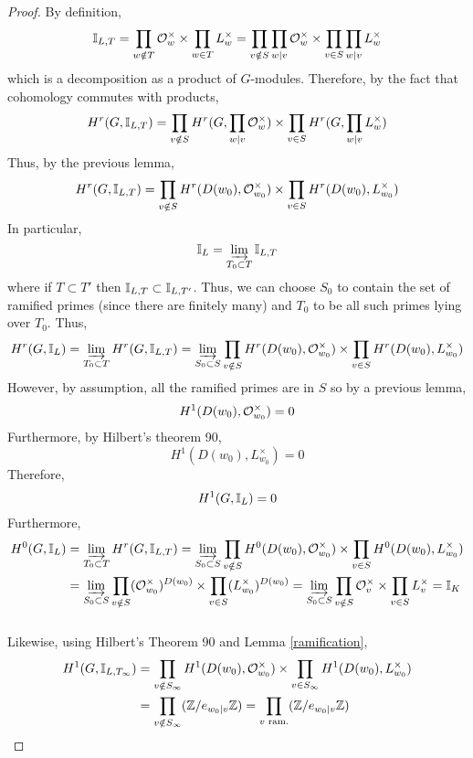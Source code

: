 \documentclass[12pt]{extarticle}
\begin{document}
\begin{proof}
By definition,
\[ \mathbb{I}_{L, T} = \prod_{w \notin T} \mathcal{O}_{w}^\times \times \prod_{w \in T} L_w^\times = \prod_{v \notin S} \prod_{w \mid v} \mathcal{O}_{w}^\times \times \prod_{v \in S} \prod_{w \mid v} L_w^\times \]
which is a decomposition as a product of $G$-modules. Therefore, by the fact that cohomology commutes with products,
\[ H^r(G, \mathbb{I}_{L, T}) = \prod_{v \notin S} H^r(G, \prod_{w \mid v} \mathcal{O}_{w}^\times) \times \prod_{v \in S} H^r(G, \prod_{w \mid v} L_w^\times) \]
Thus, by the previous lemma,
\[ H^r(G, \mathbb{I}_{L, T}) = \prod_{v \notin S} H^r(D(w_0), \mathcal{O}_{w_0}^\times) \times \prod_{v \in S} H^r(D(w_0), L_{w_0}^\times) \]
In particular, 
\[ \mathbb{I}_{L} = \varinjlim_{T_0 \subset T} \mathbb{I}_{L, T} \]
where if $T \subset T'$ then $\mathbb{I}_{L, T} \subset \mathbb{I}_{L, T'}$. Thus, we can choose $S_0$ to contain the set of ramified primes (since there are finitely many) and $T_0$ to be all such primes lying over $T_0$. Thus,
\[ H^r(G, \mathbb{I}_{L}) =  \varinjlim_{T_0 \subset T} H^r(G, \mathbb{I}_{L, T}) = \varinjlim_{S_0 \subset S} \prod_{v \notin S} H^r(D(w_0), \mathcal{O}_{w_0}^\times) \times \prod_{v \in S} H^r(D(w_0), L_{w_0}^\times) \]
However, by assumption, all the ramified primes are in $S$ so by a previous lemma,
\[ H^1(D(w_0), \mathcal{O}_{w_0}^\times) = 0 \]
Furthermore, by Hilbert's theorem 90,
\[ H^1(D(w_0), L_{w_0}^\times) = 0 \]
Therefore, 
\[ H^1(G, \mathbb{I}_{L}) = 0 \]
Furthermore, 
\begin{align*}
H^0(G, \mathbb{I}_{L}) & = \varinjlim_{T_0 \subset T} H^r(G, \mathbb{I}_{L, T}) = \varinjlim_{S_0 \subset S} \prod_{v \notin S} H^0(D(w_0), \mathcal{O}_{w_0}^\times) \times \prod_{v \in S} H^0(D(w_0), L_{w_0}^\times)
\\
& = \varinjlim_{S_0 \subset S} \prod_{v \notin S} (\mathcal{O}_{w_0}^\times)^{D(w_0)} \times \prod_{v \in S} (L_{w_0}^\times)^{D(w_0)} = \varinjlim_{S_0 \subset S} \prod_{v \notin S} \mathcal{O}_{v}^\times \times \prod_{v \in S} L_v^\times = \mathbb{I}_{K}
\end{align*}
\bigskip\\
Likewise, using Hilbert's Theorem 90 and Lemma \ref{ramification},
\begin{align*}
H^1(G, \mathbb{I}_{L, T_\infty}) & = \prod_{v \notin S_{\infty}} H^1(D(w_0), \mathcal{O}_{w_0}^\times) \times \prod_{v \in S_{\infty}} H^1(D(w_0), L_{w_0}^\times) 
\\
& = \prod_{v \notin S_{\infty}} (\mathbb{Z} / e_{w_0 | v} \mathbb{Z}) = \prod_{v \text{ ram.}} (\mathbb{Z} / e_{w_0 | v} \mathbb{Z})
\end{align*}
\end{proof}
\end{document}
